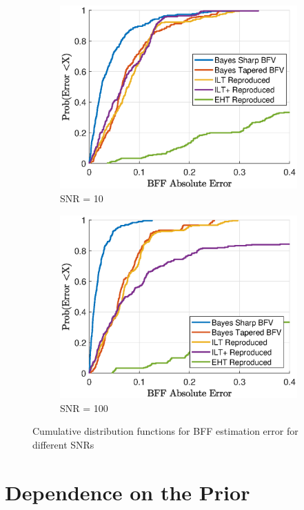 \begin{figure}[htb!]
\begin{subfigure}[b]{0.49\textwidth}
        \includegraphics[width = \textwidth]{evaluation/cdf_SNR_10.eps}
        \caption{SNR = 10}
    \end{subfigure}
    \begin{subfigure}[b]{0.49\textwidth}
        \includegraphics[width = \textwidth]{evaluation/cdf_SNR_100.eps}
        \caption{SNR = 100}
    \end{subfigure}
    \caption{Cumulative distribution functions for BFF estimation error for different SNRs}
    \label{fig:Comparative_SNR}
\end{figure}

\section{Dependence on the Prior}

